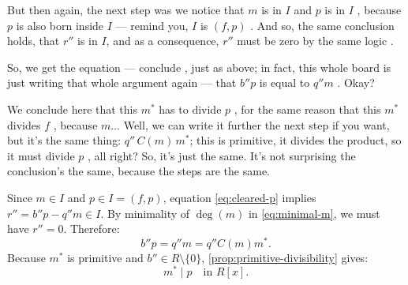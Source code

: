 \begin{proofWrapper}
\begin{hidden}
\end{hidden}

\begin{speech}[00:30:33 - 00:31:57]
But then again, the next step was we notice that $m$ is in $I$ and $p$ is in $I$ , because $p$ is also born inside $I$ --- remind you, $I$ is $(f, p)$ . And so, the same conclusion holds, that $r''$ is in $I$, and as a consequence, $r''$ must be zero by the same logic .

So, we get the equation --- conclude , just as above; in fact, this whole board is just writing that whole argument again --- that $b'' p$ is equal to $q'' m$ . Okay?

We conclude here that this $m^*$ has to divide $p$ , for the same reason that this $m^*$ divides $f$ , because $m$... Well, we can write it further the next step if you want, but it's the same thing: $q'' \, C(m) \, m^*$; this is primitive, it divides the product, so it must divide $p$ , all right? So, it's just the same. It's not surprising the conclusion's the same, because the steps are the same.
\end{speech}

\begin{content}
Since $m \in I$ and $p \in I = (f, p)$, equation \eqref{eq:cleared-p} implies $r'' = b'' p - q'' m \in I$. By minimality of $\deg(m)$ in \eqref{eq:minimal-m}, we must have $r'' = 0$. Therefore:
\begin{equation}\label{eq:bdoubleprime-p}
b'' p = q'' m = q'' C(m) m^*.
\end{equation}
Because $m^*$ is primitive and $b'' \in R \setminus \{0\}$, \cref{prop:primitive-divisibility} gives:
\begin{equation}\label{eq:mstar-div-p}
m^* \mid p \quad \text{in } R[x].
\end{equation}
\end{content}


\end{proofWrapper}

